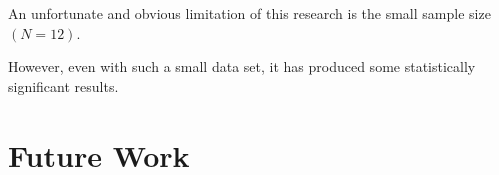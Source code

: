     An unfortunate and obvious limitation of this research is the small sample size $(N=12)$. %



However, even with such a small data set, it has produced some statistically significant results. 







            







\section{Future Work}








